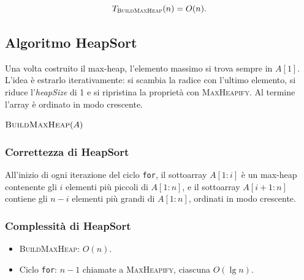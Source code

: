 \begin{teorema}
	\[
	T_{\textsc{BuildMaxHeap}}(n) = O(n).
	\]
\end{teorema}

\subsection{Algoritmo HeapSort}

\begin{softnote}
	Una volta costruito il max-heap, l'elemento massimo si trova sempre
	in $A[1]$. L'idea è estrarlo iterativamente: si scambia la radice con
	l'ultimo elemento, si riduce l'\textit{heapSize} di 1 e si ripristina
	la proprietà con \textsc{MaxHeapify}. Al termine l'array è ordinato in
	modo crescente.
\end{softnote}

\begin{algorithm}[H]
	\caption{\textsc{HeapSort}$(A)$}
	$\textsc{BuildMaxHeap}(A)$\;
\end{algorithm}

\subsubsection{Correttezza di HeapSort}

\begin{definizione}
	All'inizio di ogni iterazione del ciclo \texttt{for}, il sottoarray
	$A[1:i]$ è un max-heap contenente gli $i$ elementi più piccoli di
	$A[1:n]$, e il sottoarray $A[i+1:n]$ contiene gli $n-i$ elementi più
	grandi di $A[1:n]$, ordinati in modo crescente.
\end{definizione}

\subsubsection{Complessità di HeapSort}

\begin{itemize}
	\item \textsc{BuildMaxHeap}: $O(n)$.
	\item Ciclo \texttt{for}: $n-1$ chiamate a \textsc{MaxHeapify},
	ciascuna $O(\lg n)$.
\end{itemize}

